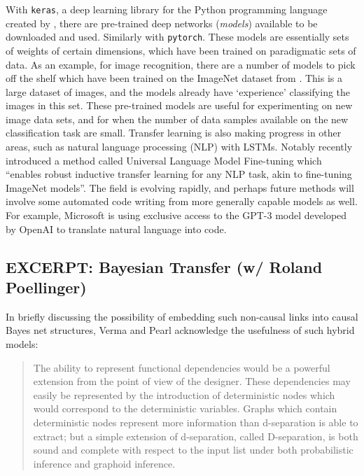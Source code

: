 \documentclass[11pt, oneside]{article}   	%
\begin{document}

With \texttt{keras}, a deep learning library for the Python programming language created by \citet{Chollet2015keras}, there are pre-trained deep networks (\emph{models}) available to be downloaded and used.  Similarly with \texttt{pytorch}.  These models are essentially sets of weights of certain dimensions, which have been trained on paradigmatic sets of data.  As an example, for image recognition, there are a number of models to pick off the shelf which have been trained on the ImageNet dataset from  \citet{Dengetal2009}.  This is a large dataset of images, and the models already have `experience' classifying the images in  this set.  These pre-trained models are useful for experimenting on new image data sets, and for when the number of data samples available on the new classification task are small.  Transfer learning is also making progress in other areas, such as natural language processing (NLP) with LSTMs.  Notably \citet{Ruderetal2018} recently introduced a method called Universal Language Model Fine-tuning which ``enables robust inductive transfer learning for any NLP task, akin to fine-tuning ImageNet models''.  The field is evolving rapidly, and perhaps future methods will involve some automated code writing from more generally capable models as well.  For example, Microsoft is using exclusive access to the GPT-3 model developed by OpenAI \citep{OpenAI_GPT-3} to translate natural language into code.


\subsection{EXCERPT: Bayesian Transfer (w/ Roland Poellinger)}

In briefly discussing the possibility of embedding such non-causal links into causal Bayes net structures, Verma and Pearl acknowledge the usefulness of such hybrid models:

\begin{quote}
The ability to represent functional dependencies would be a powerful extension from the point of view of the designer. These dependencies may easily be represented by the introduction of deterministic nodes which would correspond to the deterministic variables. Graphs which contain deterministic nodes represent more information than d-separation is able to extract; but a simple extension of d-separation, called D-separation, is both sound and complete with respect to the input list under both probabilistic inference and graphoid inference.  \cite[p. 75]{VermaPearlCausalNetworks1988} %
%
\end{quote}
\end{document}
